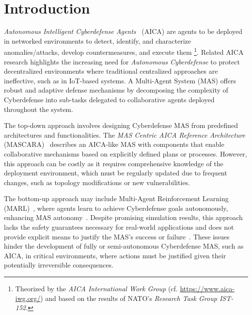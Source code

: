



\section{Introduction}
\label{sec:introduction}

\textit{Autonomous Intelligent Cyberdefense Agents}~\cite{Kott2023} (AICA) are agents to be deployed in networked environments to detect, identify, and characterize anomalies/attacks, develop countermeasures, and execute them
%
\footnote{
  Theorized by the \textit{AICA International Work Group} (cf. \url{https://www.aica-iwg.org/}) and based on the results of NATO's \textit{Research Task Group IST-152}.
}.
Related AICA research highlights the increasing need for \textit{Autonomous Cyberdefense} to protect decentralized environments where traditional centralized approaches are ineffective, such as in IoT-based systems. A Multi-Agent System (MAS) offers robust and adaptive defense mechanisms by decomposing the complexity of Cyberdefense into sub-tasks delegated to collaborative agents deployed throughout the system.

The top-down approach involves designing Cyberdefense MAS from predefined architectures and functionalities. The \textit{MAS Centric AICA Reference Architecture} (MASCARA)~\cite{Kott2023} describes an AICA-like MAS with components that enable collaborative mechanisms based on explicitly defined plans or processes. However, this approach can be costly as it requires comprehensive knowledge of the deployment environment, which must be regularly updated due to frequent changes, such as topology modifications or new vulnerabilities.

The bottom-up approach may include Multi-Agent Reinforcement Learning (MARL)~\cite{Albrecht2024}, where agents learn to achieve Cyberdefense goals autonomously, enhancing MAS autonomy~\cite{hammar_stadle4_noms_23}. Despite promising simulation results, this approach lacks the safety guarantees necessary for real-world applications and does not provide explicit means to justify the MAS's success or failure~\cite{dulacarnold2019}. These issues hinder the development of fully or semi-autonomous Cyberdefense MAS, such as AICA, in critical environments, where actions must be justified given their potentially irreversible consequences.

